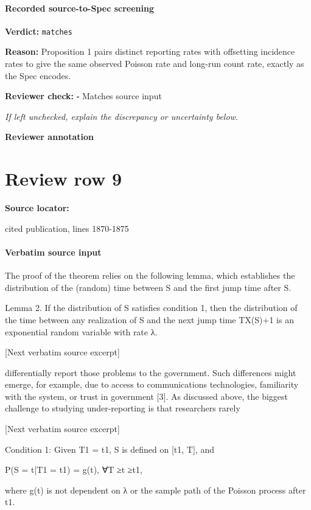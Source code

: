 \documentclass[10pt]{article}
\newcommand{\reviewerbox}{%
  \par\noindent\fbox{\parbox{0.96\linewidth}{\rule{0pt}{0.38in}}}\par
}
\newcommand{\reviewmatch}[1]{%
  \par\noindent\textbf{Reviewer check:} $\square$\; #1\par
  \noindent\emph{If left unchecked, explain the discrepancy or uncertainty below.}\par
}
\begin{document}
\paragraph{Recorded source-to-Spec screening}
\textbf{Verdict:} \texttt{matches}
\\
{\raggedright
\textbf{Reason:} Proposition 1 pairs distinct reporting rates with offsetting incidence rates to give the same observed Poisson rate and long-\allowbreak{}run count rate, exactly as the Spec encodes.\allowbreak{}
\par}
\reviewmatch{Matches source input}
\noindent\textbf{Reviewer annotation}\par
\reviewerbox
\clearpage
\hypertarget{source-claim-73044f3612c3e67c}{}
\section*{Review row 9}
\textbf{Source locator:} {\footnotesize\raggedright cited publication, lines 1870-\allowbreak{}1875\par}
\paragraph{Verbatim source input}
\begin{ReviewVerbatim}
The proof of the theorem relies on the following lemma, which establishes the distribution of
the (random) time between S and the first jump time after S.

Lemma 2. If the distribution of S satisfies condition 1, then the distribution of the time between
any realization of S and the next jump time TX(S)+1 is an exponential random variable with rate
λ.

[Next verbatim source excerpt]

differentially report those problems to the government. Such differences might emerge, for example,
due to access to communications technologies, familiarity with the system, or trust in government
[3]. As discussed above, the biggest challenge to studying under-reporting is that researchers rarely

[Next verbatim source excerpt]

Condition 1: Given T1 = t1, S is defined on [t1, T], and

P(S = t|T1 = t1) = g(t), ∀T ≥t ≥t1,

where g(t) is not dependent on λ or the sample path of the Poisson process after t1.
\end{ReviewVerbatim}
\end{document}
